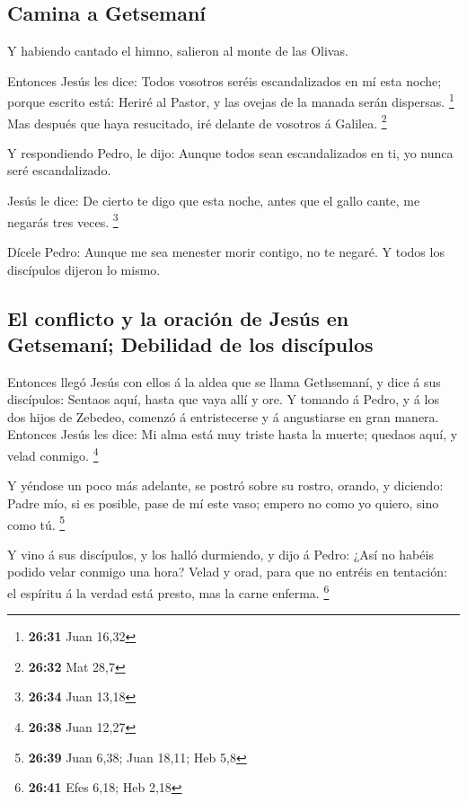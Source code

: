 \hypertarget{camina-a-getsemanuxed}{%
\subsection{Camina a Getsemaní}\label{camina-a-getsemanuxed}}

 Y habiendo cantado el himno, salieron al monte de las
Olivas.

 Entonces Jesús les dice: Todos vosotros seréis
escandalizados en mí esta noche; porque escrito está: Heriré al Pastor,
y las ovejas de la manada serán dispersas. \footnote{\textbf{26:31} Juan
  16,32}  Mas después que haya resucitado, iré delante de
vosotros á Galilea. \footnote{\textbf{26:32} Mat 28,7}

 Y respondiendo Pedro, le dijo: Aunque todos sean
escandalizados en ti, yo nunca seré escandalizado.

 Jesús le dice: De cierto te digo que esta noche, antes que
el gallo cante, me negarás tres veces. \footnote{\textbf{26:34} Juan
  13,18}

 Dícele Pedro: Aunque me sea menester morir contigo, no te
negaré. Y todos los discípulos dijeron lo mismo.

\hypertarget{el-conflicto-y-la-oraciuxf3n-de-jesuxfas-en-getsemanuxed-debilidad-de-los-discuxedpulos}{%
\subsection{El conflicto y la oración de Jesús en Getsemaní; Debilidad
de los
discípulos}\label{el-conflicto-y-la-oraciuxf3n-de-jesuxfas-en-getsemanuxed-debilidad-de-los-discuxedpulos}}

 Entonces llegó Jesús con ellos á la aldea que se llama
Gethsemaní, y dice á sus discípulos: Sentaos aquí, hasta que vaya allí y
ore.  Y tomando á Pedro, y á los dos hijos de Zebedeo,
comenzó á entristecerse y á angustiarse en gran manera. 
Entonces Jesús les dice: Mi alma está muy triste hasta la muerte;
quedaos aquí, y velad conmigo. \footnote{\textbf{26:38} Juan 12,27}

 Y yéndose un poco más adelante, se postró sobre su rostro,
orando, y diciendo: Padre mío, si es posible, pase de mí este vaso;
empero no como yo quiero, sino como tú. \footnote{\textbf{26:39} Juan
  6,38; Juan 18,11; Heb 5,8}

 Y vino á sus discípulos, y los halló durmiendo, y dijo á
Pedro: ¿Así no habéis podido velar conmigo una hora?  Velad
y orad, para que no entréis en tentación: el espíritu á la verdad está
presto, mas la carne enferma. \footnote{\textbf{26:41} Efes 6,18; Heb
  2,18}

